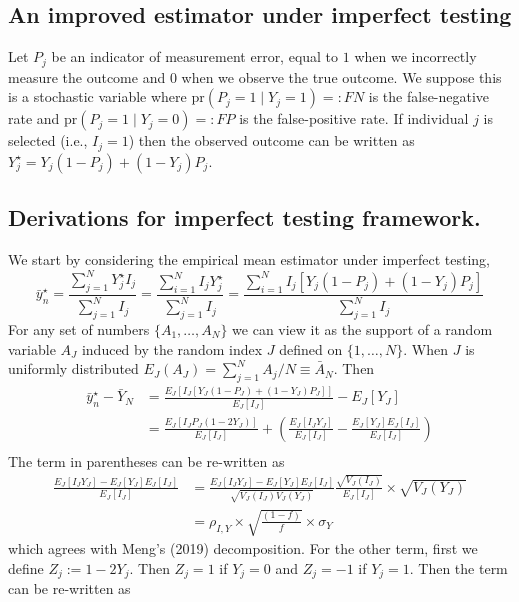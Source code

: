 \documentclass[11pt]{amsart}
\numberwithin{equation}{section}
\theoremstyle{plain}
\def\pr{\text{pr}}
\begin{document}
\subsection{An improved estimator under imperfect testing}


Let $P_j$ be an indicator of measurement error, equal to $1$ when we incorrectly measure the outcome and $0$ when we observe the true outcome. We suppose this is a stochastic variable where $\pr(P_j = 1 \mid Y_j = 1) =: FN$ is the false-negative rate and $\pr(P_j = 1 \mid Y_j = 0) =: FP$ is the false-positive rate.  If individual $j$ is selected (i.e., $I_j = 1$) then the observed outcome can be written as $Y_j^{\star} = Y_j(1-P_j) + (1-Y_j) P_j$.

\subsection{Derivations for imperfect testing framework.}
\label{app:imperfect}
We start by considering the empirical mean estimator under imperfect testing,
$$
\bar y_n^\star = \frac{\sum_{j=1}^N Y_j^\star I_j}{\sum_{j=1}^N I_j} = \frac{\sum_{i=1}^N  I_j Y_j^\star }{\sum_{j=1}^N  I_j } = \frac{\sum_{i=1}^N  I_j \left[ Y_j (1-P_j) + (1-Y_j) P_j \right]}{\sum_{j=1}^N  I_j }
$$
For any set of numbers $\{ A_1, \ldots, A_N \}$ we can view it as the support of a random variable $A_J$ induced by the random index $J$ defined on $\{1,\ldots, N\}$.  When $J$ is uniformly distributed $E_J (A_J) = \sum_{j=1}^N A_j / N \equiv \bar A_N$. Then
$$
\begin{aligned}
\bar y_n^\star  - \bar Y_N &= \frac{E_J \left[ I_J \left[ Y_J (1-P_J) + (1-Y_J) P_J \right] \right]}{E_J [ I_J ] } - E_J[Y_J] \\
&= \frac{E_J \left[ I_J P_J (1-2Y_J) \right]}{E_J [ I_J ] } + \left( \frac{E_J [I_J Y_J]}{E_J [ I_J ] } - \frac{E_J[Y_J] E_J[I_J]}{E_J[I_J]} \right) \\
\end{aligned}
$$
The term in parentheses can be re-written as
$$
\begin{aligned}
\frac{E_J [I_J Y_J]- E_J[Y_J] E_J[I_J]}{E_J[I_J]} &=  \frac{E_J [I_J Y_J]- E_J[Y_J] E_J[I_J]}{\sqrt{V_J(I_J) V_J(Y_J)}} \frac{\sqrt{V_J(I_J)}}{E_J[I_J]} \times \sqrt{V_J(Y_J)} \\
&= \rho_{I,Y} \times \sqrt{\frac{(1-f)}{f}} \times \sigma_Y
\end{aligned}
$$
which agrees with Meng's (2019) decomposition. For the other term, first we define $Z_j := 1 - 2 Y_j $. Then $Z_j = 1$ if $Y_j = 0$ and $Z_j = -1$ if $Y_j = 1$. Then the term can be re-written as
\end{document}
